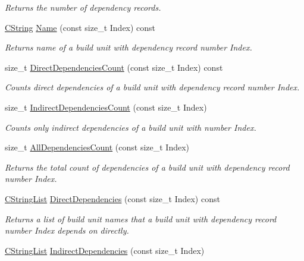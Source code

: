 \begin{DoxyCompactItemize}
\begin{DoxyCompactList}\small\item\em Returns the number of dependency records. \end{DoxyCompactList}\item 
\hyperlink{classCString}{C\-String} \hyperlink{classCDependencyInfo_abd5a916dfc975667d25d9216d15a3ccf}{Name} (const size\-\_\-t Index) const 
\begin{DoxyCompactList}\small\item\em Returns name of a build unit with dependency record number {\itshape Index}. \end{DoxyCompactList}\item 
size\-\_\-t \hyperlink{classCDependencyInfo_a22150f25fecc523402af14ea5c57d104}{Direct\-Dependencies\-Count} (const size\-\_\-t Index) const 
\begin{DoxyCompactList}\small\item\em Counts direct dependencies of a build unit with dependency record number {\itshape Index}. \end{DoxyCompactList}\item 
size\-\_\-t \hyperlink{classCDependencyInfo_a918389de5c0c99a3e69026ea0176c89e}{Indirect\-Dependencies\-Count} (const size\-\_\-t Index)
\begin{DoxyCompactList}\small\item\em Counts only indirect dependencies of a build unit with number {\itshape Index}. \end{DoxyCompactList}\item 
size\-\_\-t \hyperlink{classCDependencyInfo_acd47e7cf24369dd634b509c6932f7dca}{All\-Dependencies\-Count} (const size\-\_\-t Index)
\begin{DoxyCompactList}\small\item\em Returns the total count of dependencies of a build unit with dependency record number {\itshape Index}. \end{DoxyCompactList}\item 
\hyperlink{classCStringList}{C\-String\-List} \hyperlink{classCDependencyInfo_a00b6287cc4a978f8abfa2b1442175d24}{Direct\-Dependencies} (const size\-\_\-t Index) const 
\begin{DoxyCompactList}\small\item\em Returns a list of build unit names that a build unit with dependency record number {\itshape Index} depends on directly. \end{DoxyCompactList}\item 
\hyperlink{classCStringList}{C\-String\-List} \hyperlink{classCDependencyInfo_a51e609331ebc077d6eea5778fd8f8c8b}{Indirect\-Dependencies} (const size\-\_\-t Index)

\end{DoxyCompactItemize}
